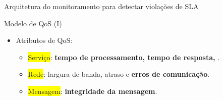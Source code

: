 \documentclass[xcolor=svgnames]{beamer}
\begin{document}
\begin{frame}{Arquitetura do monitoramento para detectar violações de SLA}
    \end{frame}

  \begin{frame}{ Modelo de QoS  (I)}
    \begin{itemize} %
	\item Atributos de QoS:
	    \begin{itemize}
	      \item <2->\colorbox{yellow}{Serviço}: \textbf{tempo de processamento, tempo de resposta, }.
	      \item <3->\colorbox{yellow}{Rede}: largura de banda, atraso e \textbf{erros de comunicação}.
	      \item <4->\colorbox{yellow}{Mensagem}: \textbf{integridade da mensagem}.
	    \end{itemize}
    \end{itemize}
  \end{frame}
\end{document}
